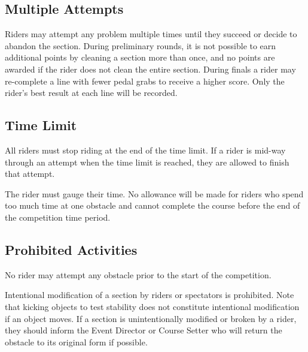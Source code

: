 \subsection{Multiple Attempts}
Riders may attempt any problem multiple times until they succeed or decide to abandon the section.
During preliminary rounds, it is not possible to earn additional points by cleaning a section more than once, and no points are awarded if the rider does not clean the entire section.
During finals a rider may re-complete a line with fewer pedal grabs to receive a higher score.
Only the rider's best result at each line will be recorded.

\subsection{Time Limit}

All riders must stop riding at the end of the time limit.
If a rider is mid-way through an attempt when the time limit is reached, they are allowed to finish that attempt.

The rider must gauge their time.
No allowance will be made for riders who spend too much time at one obstacle and cannot complete the course before the end of the competition time period.

\subsection{Prohibited Activities}
No rider may attempt any obstacle prior to the start of the competition.

Intentional modification of a section by riders or spectators is prohibited.
Note that kicking objects to test stability does not constitute intentional modification if an object moves.
If a section is unintentionally modified or broken by a rider, they should inform the Event Director or Course Setter who will return the obstacle to its original form if possible.%
